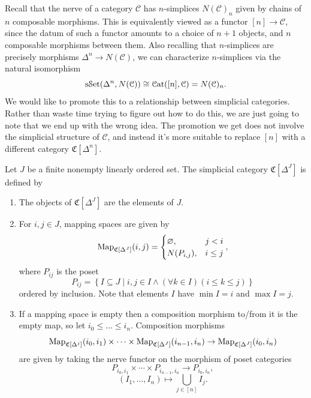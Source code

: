 Recall that the nerve of a category $\mathcal{C} $ has $n$-simplices $N(\mathcal{C} )_n$ given by chains of $n$ composable morphisms. This is equivalently viewed as a functor $[n]\to \mathcal{C} $, since the datum of such a functor amounts to a choice of $n+1$ objects, and $n$ composable morphisms between them. Also recalling that $n$-simplices are precisely morphisms $\Delta^n \to N(\mathcal{C}) $, we can characterize $n$-simplices via the natural isomorphism
\[
	\mathrm{s}\mathcal{S}\mathrm{et} (\Delta^n,N(\mathcal{C} ))\cong \mathcal{C}\mathrm{at} ([n],\mathcal{C} )=N(\mathcal{C} )_n
.\]
We would like to promote this to a relationship between simplicial categories. Rather than waste time trying to figure out how to do this, we are just going to note that we end up with the wrong idea. The promotion we get does not involve the simplicial structure of $\mathcal{C} $, and instead it's more suitable to replace $[n]$ with a different category $\mathfrak{C} [\Delta^n]$.

\begin{definition}\label{1.1.5.1}
	Let $J$ be a finite nonempty linearly ordered set. The simplicial category $\mathfrak{C} [\Delta^J]$ is defined by
	\begin{enumerate}
		\item The objects of $\mathfrak{C} [\Delta^J]$ are the elements of $J$.
	\item For $i,j\in J$, mapping spaces are given by
		\[
			\operatorname{Map}_{\mathfrak{C} [\Delta^J]} (i,j)=
			\begin{cases}
				\varnothing ,&j<i\\
				N(P_{i,j} ),&i\leq j
			\end{cases}
		,\]
		where $P_{ij} $ is the poset
		\[
			P_{ij} =\left\{ I\subseteq J\mid i,j\in I \land (\forall k\in I)(i\leq k\leq j)\right\} 
		\]
		ordered by inclusion. Note that elements $I$ have $\min I = i$ and $\max I = j$.
	\item If a mapping space is empty then a composition morphism to/from it is the empty map, so let $i_0 \leq \ldots \leq i_n$. Composition morphisms
		\[
			\operatorname{Map} _{\mathfrak{C} [\Delta^j]} (i_0,i_1)\times \cdots \times \operatorname{Map}_{\mathfrak{C} [\Delta^J]} (i_{n-1} ,i_n)\to \operatorname{Map} _{\mathfrak{C} [\Delta^J]} (i_0,i_n)
		\]
		are given by taking the nerve functor on the morphism of poset categories
		\[
			P_{i_0,i_1} \times \cdots \times P_{i_{n-1} ,i_n} \to P_{i_0,i_n} ,
		\]
		\[
			(I_1, \ldots ,I_n) \mapsto \bigcup_{j\in [n]} I_j
		.\]
	\end{enumerate}
\end{definition}

